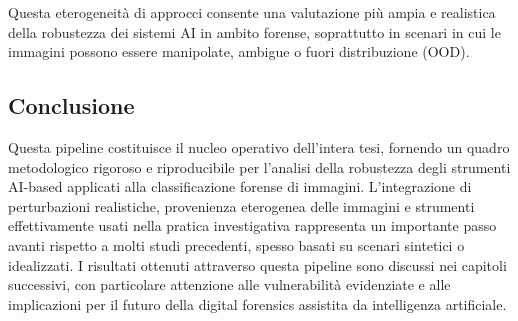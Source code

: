 Questa eterogeneità di approcci consente una valutazione più ampia e realistica della robustezza dei sistemi AI in ambito forense, soprattutto in scenari in cui le immagini possono essere manipolate, ambigue o fuori distribuzione (OOD).



\subsection*{Conclusione}

Questa pipeline costituisce il nucleo operativo dell’intera tesi, fornendo un quadro metodologico rigoroso e riproducibile per l’analisi della robustezza degli strumenti AI-based applicati alla classificazione forense di immagini. L'integrazione di perturbazioni realistiche, provenienza eterogenea delle immagini e strumenti effettivamente usati nella pratica investigativa rappresenta un importante passo avanti rispetto a molti studi precedenti, spesso basati su scenari sintetici o idealizzati. I risultati ottenuti attraverso questa pipeline sono discussi nei capitoli successivi, con particolare attenzione alle vulnerabilità evidenziate e alle implicazioni per il futuro della digital forensics assistita da intelligenza artificiale.






